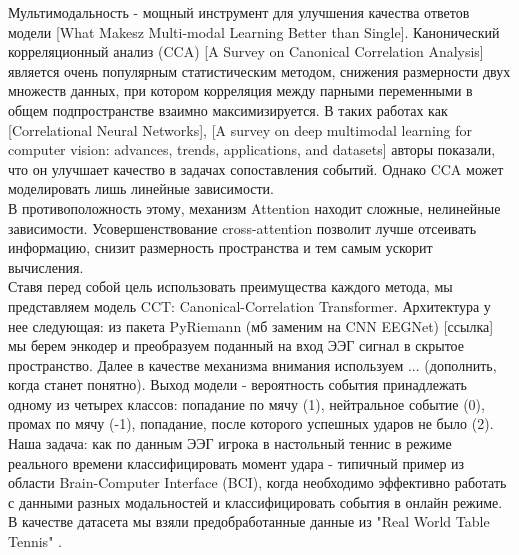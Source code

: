 \documentclass[a4paper,14pt]{article}
\theoremstyle{plain} %
\theoremstyle{definition} %
\theoremstyle{remark} %
\begin{document}
        Мультимодальность - мощный инструмент для улучшения качества ответов модели [What Makesz Multi-modal Learning Better than Single]. Канонический корреляционный анализ (CCA) [A Survey on Canonical Correlation Analysis] является очень популярным статистическим методом, снижения размерности двух множеств данных, при котором корреляция между парными переменными в общем подпространстве взаимно максимизируется. В таких работах как [Correlational Neural Networks], [A survey on deep multimodal learning for computer vision: advances, trends, applications, and datasets] авторы показали, что он улучшает качество в задачах сопоставления событий. Однако CCA может моделировать лишь линейные зависимости. \\
        В противоположность этому, механизм Attention находит сложные, нелинейные зависимости. Усовершенствование cross-attention позволит лучше отсеивать информацию, снизит размерность пространства и тем самым ускорит вычисления. \\
        Ставя перед собой цель использовать преимущества каждого метода, мы представляем модель CCT: Canonical-Correlation Transformer. Архитектура у нее следующая: из пакета PyRiemann (мб заменим на CNN EEGNet) [ссылка] мы берем энкодер и преобразуем поданный на вход ЭЭГ сигнал в скрытое пространство. Далее в качестве механизма внимания используем ... (дополнить, когда станет понятно). Выход модели - вероятность события принадлежать одному из четырех классов: попадание по мячу (1), нейтральное событие (0), промах по мячу (-1), попадание, после которого успешных ударов не было (2). \\    
        Наша задача: как по данным ЭЭГ игрока в настольный теннис в режиме реального времени классифицировать момент удара - типичный пример из области Brain-Computer Interface (BCI), когда необходимо эффективно работать с данными разных модальностей и классифицировать события в онлайн режиме. В качестве датасета мы взяли предобработанные данные из "Real World Table Tennis" \cite{amanda2024dataset}.\\
\end{document}
